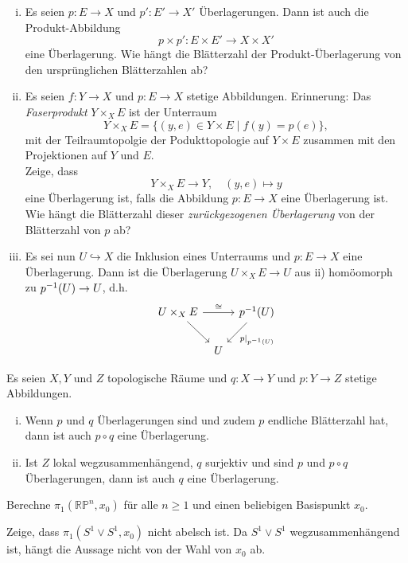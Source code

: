 \begin{aufgabe}
\begin{enumerate}[i)]
	\item Es seien $p\colon E\to X$ und  $p'\colon E'\to X'$ Überlagerungen.
	Dann ist auch die Produkt-Abbildung
	\[  p\times p' \colon E\times E' \to X\times X'\]
	eine Überlagerung. Wie hängt die Blätterzahl der
	Produkt-Überlagerung von den ursprünglichen Blätterzahlen ab?
	\item Es seien $f\colon Y\to X$ und $p\colon E\to X$ stetige Abbildungen.
	Erinnerung: Das \emph{Faserprodukt} $Y\times_XE$ ist der Unterraum 
	\[ Y\times_XE = \{ (y,e) \in Y\times E\mid f(y) = p(e) \}, \]
	mit der Teilraumtopolgie der Podukttopologie auf $Y\times E$ zusammen mit den Projektionen auf $Y$ und $E$.\\
	
	Zeige, dass 
	$$ Y\times_XE \to Y , \quad (y,e)\mapsto y $$
	eine Überlagerung ist, falls die Abbildung $p\colon E\to X$ eine
	Überlagerung ist. Wie hängt die Blätterzahl
	dieser {\em zurückgezogenen Überlagerung} von der Blätterzahl von $p$ ab?
	\item Es sei nun $U\hookrightarrow X$ die Inklusion eines Unterraums und $p\colon E\to X$ eine Überlagerung. Dann ist die Überlagerung $U\times_X E\to U$ aus ii) homöomorph zu $p^{-1} (U)\to U$, d.h.
	\[ \begin{tikzcd}[column sep = tiny]
		U\times_X E \arrow[rr, "\cong"] \arrow[rd] && p^{-1}(U)\arrow[ld, "p|_{p^{-1}(U)}"]\\
		& U &	\end{tikzcd}\]
\end{enumerate}
\end{aufgabe}
\begin{aufgabe}
	Es seien $X,Y$ und $Z$ topologische Räume und $q\colon X\to Y$ und $p\colon Y\to Z$ stetige Abbildungen.
	\begin{enumerate}[i)]
		\item Wenn $p$ und $q$ Überlagerungen sind und zudem $p$ endliche Blätterzahl hat, dann ist auch $p\circ q$ eine Überlagerung.
		\item Ist $Z$ lokal wegzusammenhängend, $q$ surjektiv und sind $p$ und $p\circ q$ Überlagerungen, dann ist auch $q$ eine Überlagerung.
	\end{enumerate}
\end{aufgabe}
\begin{aufgabe}
	Berechne $\pi_1(\mathbb{RP}^n,x_0)$ für alle $n\geq 1$ und einen beliebigen Basispunkt $x_0$. 
\end{aufgabe}
\begin{aufgabe}
	Zeige, dass $\pi_1(S^1\vee S^1,x_0)$ nicht abelsch ist. Da $S^1\vee S^1$ wegzusammenhängend ist, hängt die Aussage nicht von der Wahl von $x_0$ ab.
\end{aufgabe}
